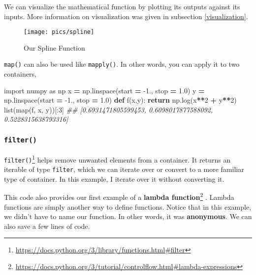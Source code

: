 \documentclass[12pt,krantz2]{krantz}
\makeatletter
\newenvironment{Shaded}{\begin{snugshade}}{\end{snugshade}}
\newcommand{\BuiltInTok}[1]{#1}
\newcommand{\CommentTok}[1]{\textcolor[rgb]{0.37,0.37,0.37}{\textit{#1}}}
\newcommand{\ControlFlowTok}[1]{\textcolor[rgb]{0.27,0.27,0.27}{\textbf{#1}}}
\newcommand{\DecValTok}[1]{\textcolor[rgb]{0.06,0.06,0.06}{#1}}
\newcommand{\FloatTok}[1]{\textcolor[rgb]{0.06,0.06,0.06}{#1}}
\newcommand{\ImportTok}[1]{#1}
\newcommand{\KeywordTok}[1]{\textcolor[rgb]{0.27,0.27,0.27}{\textbf{#1}}}
\newcommand{\NormalTok}[1]{#1}
\newcommand{\OperatorTok}[1]{\textcolor[rgb]{0.43,0.43,0.43}{\textbf{#1}}}
\renewcommand{\href}[2]{#2\footnote{\url{#1}}}
\newenvironment{kframe}{%
\medskip{}
\setlength{\fboxsep}{.8em}
 \def\at@end@of@kframe{}%
 \ifinner\ifhmode%
  \def\at@end@of@kframe{\end{minipage}}%
  \begin{minipage}{\columnwidth}%
 \fi\fi%
 \def\FrameCommand##1{\hskip\@totalleftmargin \hskip-\fboxsep
 \colorbox{shadecolor}{##1}\hskip-\fboxsep
     \hskip-\linewidth \hskip-\@totalleftmargin \hskip\columnwidth}%
 \MakeFramed {\advance\hsize-\width
   \@totalleftmargin\z@ \linewidth\hsize
   \@setminipage}}%
 {\par\unskip\endMakeFramed%
 \at@end@of@kframe}
\renewenvironment{Shaded}{\begin{kframe}}{\end{kframe}}
\makeatother
\begin{document}
We can visualize the mathematical function by plotting its outputs against its inputs. More information on visualization was given in subsection \ref{visualization}.

\begin{figure}

{\centering \texttt{[image: pics/spline]} 

}

\caption{Our Spline Function}\label{fig:spline-plot}
\end{figure}

\texttt{map()} can also be used like \texttt{mapply()}. In other words, you can apply it to two containers,

\begin{Shaded}
\begin{Highlighting}[]
\ImportTok{import}\NormalTok{ numpy }\ImportTok{as}\NormalTok{ np}
\NormalTok{x }\OperatorTok{=}\NormalTok{ np.linspace(start }\OperatorTok{=} \FloatTok{-1.}\NormalTok{, stop }\OperatorTok{=} \FloatTok{1.0}\NormalTok{)}
\NormalTok{y }\OperatorTok{=}\NormalTok{ np.linspace(start }\OperatorTok{=} \FloatTok{-1.}\NormalTok{, stop }\OperatorTok{=} \FloatTok{1.0}\NormalTok{)}
\KeywordTok{def}\NormalTok{ f(x,y):}
    \ControlFlowTok{return}\NormalTok{ np.log(x}\OperatorTok{**}\DecValTok{2} \OperatorTok{+}\NormalTok{ y}\OperatorTok{**}\DecValTok{2}\NormalTok{)}
\BuiltInTok{list}\NormalTok{(}\BuiltInTok{map}\NormalTok{(f, x, y))[:}\DecValTok{3}\NormalTok{]}
\CommentTok{## [0.6931471805599453, 0.6098017877588092, 0.5228315638793316]}
\end{Highlighting}
\end{Shaded}

\hypertarget{filter}{%
\subsubsection{\texorpdfstring{\texttt{filter()}}{filter()}}\label{filter}}

\href{https://docs.python.org/3/library/functions.html\#filter}{\texttt{filter()}} helps remove unwanted elements from a container. It returns an iterable of type \texttt{filter}, which we can iterate over or convert to a more familiar type of container. In this example, I iterate over it without converting it.

This code also provides our first example of a \href{https://docs.python.org/3/tutorial/controlflow.html\#lambda-expressions}{\textbf{lambda function}} \citep{Lutz13}. Lambda functions are simply another way to define functions. Notice that in this example, we didn't have to name our function. In other words, it was \textbf{anonymous}. We can also save a few lines of code.
\end{document}
